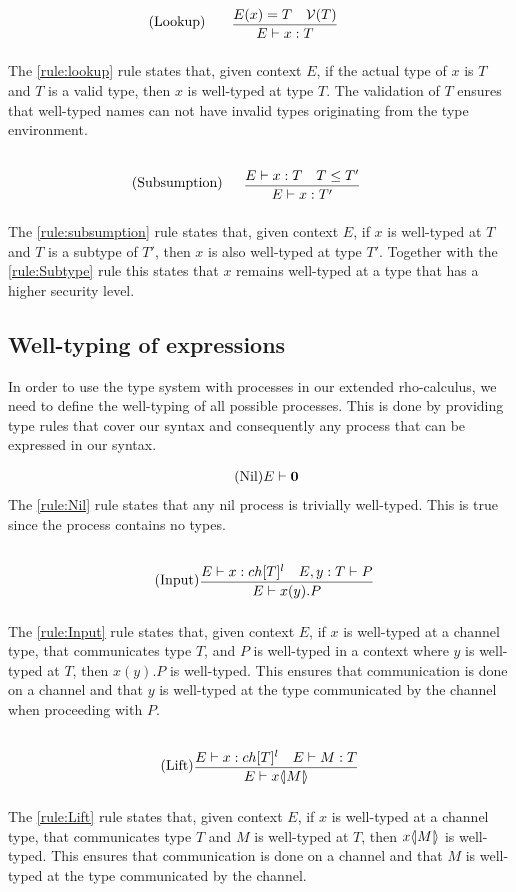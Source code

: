 \begin{align*}
    \tag{Lookup}\label{rule:lookup} &\infrule{E(x)=T\quad\valid{T}}{E\vdash x:T}
\end{align*}
The \ref{rule:lookup} rule states that, given context $E$, if the actual type of $x$ is $T$ and $T$ is a valid type, then $x$ is well-typed at type $T$.
The validation of $T$ ensures that well-typed names can not have invalid types originating from the type environment.

\begin{align*}
    \tag{Subsumption}\label{rule:subsumption} &\infrule{E\vdash x:T\quad T\leq T'}{E\vdash x:T'}
\end{align*}
The \ref{rule:subsumption} rule states that, given context $E$, if $x$ is well-typed at $T$ and $T$ is a subtype of $T'$, then $x$ is also well-typed at type $T'$.
Together with the \ref{rule:Subtype} rule this states that $x$ remains well-typed at a type that has a higher security level.

\subsection{Well-typing of expressions}
In order to use the type system with processes in our extended rho-calculus, we need to define the well-typing of all possible processes.
This is done by providing type rules that cover our syntax and consequently any process that can be expressed in our syntax.

\begin{align*}
    \tag{Nil}\label{rule:Nil} &E \vdash \mathbf{0}
\end{align*}
The \ref{rule:Nil} rule states that any nil process is trivially well-typed.
This is true since the process contains no types.

\begin{align*}
    \tag{Input}\label{rule:Input} &\infrule{E\vdash x:ch[T]^l\quad E,y:T\vdash P}{E \vdash \inp{x}{y}P}
\end{align*}
The \ref{rule:Input} rule states that, given context $E$, if $x$ is well-typed at a channel type, that communicates type $T$, and $P$ is well-typed in a context where $y$ is well-typed at $T$, then $x(y).P$ is well-typed.
This ensures that communication is done on a channel and that $y$ is well-typed at the type communicated by the channel when proceeding with $P$.

\begin{align*}
    \tag{Lift}\label{rule:Lift} &\infrule{E\vdash x:ch[T]^l\quad E \vdash M:T}{E\vdash \lift{x}{M}}
\end{align*}
The \ref{rule:Lift} rule states that, given context $E$, if $x$ is well-typed at a channel type, that communicates type $T$ and $M$ is well-typed at $T$, then $x \langle \! | M | \! \rangle$ is well-typed.
This ensures that communication is done on a channel and that $M$ is well-typed at the type communicated by the channel.

